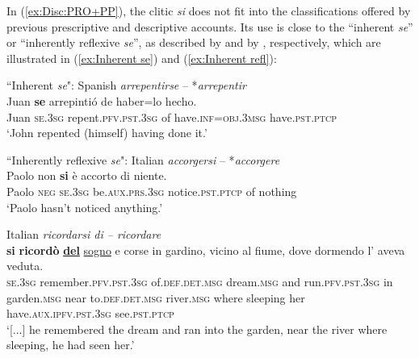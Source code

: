\documentclass[output=paper,colorlinks,citecolor=brown]{langscibook}
\begin{document}
In (\ref{ex:Disc:PRO+PP}), the clitic \textit{si} does not fit into the classifications offered by previous prescriptive and descriptive accounts. Its use is close to the “inherent \textit{se}” or “inherently reflexive \textit{se}”, as described by  \citet[426]{nishida_spanish_1994} and by \citet[8]{medova_reflexive_2009}, respectively, which are illustrated in (\ref{ex:Inherent se}) and (\ref{ex:Inherent refl}):

\begin{exe}
\ex ``Inherent \textit{se}": Spanish \textit{arrepentirse} -- *\textit{arrepentir} \\ \label{ex:Inherent se}
    \gll Juan \textbf{se} arrepintió de haber=lo hecho.\\
    Juan \textsc{se}.\textsc{3sg} repent.\textsc{pfv.pst.3sg} of have.\textsc{inf=obj.3msg} have.\textsc{pst.ptcp}\\
    \glt ‘John repented (himself) having done it.’ \citep[426]{nishida_spanish_1994}
\end{exe}

\begin{exe}
\ex ``Inherently reflexive \textit{se}": Italian \textit{accorgersi} -- *\textit{accorgere} \\ \label{ex:Inherent refl}
    \gll Paolo non \textbf{si} è accorto di niente.\\
    Paolo \textsc{neg} \textsc{se}.\textsc{3sg} be.\textsc{aux.prs.3sg} notice.\textsc{pst.ptcp} of nothing\\
    \glt ‘Paolo hasn't noticed anything.’ \citep[76]{sorace_unaccusativity_1993}
\end{exe}

\begin{exe}
\ex Italian \textit{ricordarsi di -- ricordare} \\ \label{ex:PRO TR}
    \gll [...] \textbf{si} \textbf{ricordò} \ul{\textbf{del}} \ul{sogno} e corse in gardino, vicino al fiume, dove dormendo l' aveva veduta.\\
    [...] \textsc{se}.\textsc{3sg} remember.\textsc{pfv.pst.3sg} of.\textsc{def.det.msg} dream.\textsc{msg} and run.\textsc{pfv.pst.3sg} in garden.\textsc{msg} near to.\textsc{def.det.msg} river.\textsc{msg} where sleeping her have.\textsc{aux.ipfv.pst.3sg} see.\textsc{pst.ptcp} \\ 
    \glt ‘[...] he remembered the dream and ran into the garden, near the river where sleeping, he had seen her.’
\end{exe}
\end{document}

